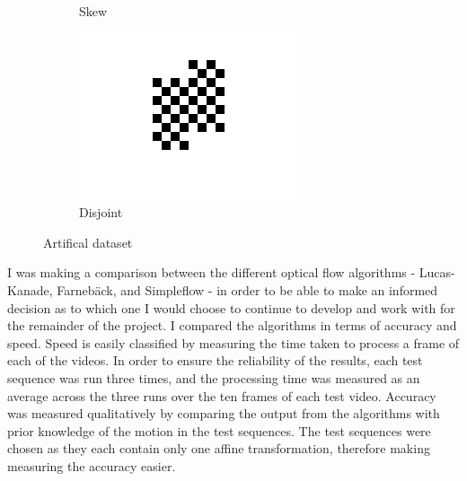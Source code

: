 \documentclass[a4paper,10pt]{article}
\begin{document}
\begin{figure}[h]
\begin{subfigure}[b]{.16\textwidth}
            \caption{Skew}
            \label{fig:skew}
          \end{subfigure}
          \begin{subfigure}[b]{.16\textwidth}
            \includegraphics[width=\textwidth]{disjoint}
            \caption{Disjoint}
            \label{fig:disj}
          \end{subfigure}
          \caption{Artifical dataset}
          \label{fig:artificial}
       \end{figure}
       
       I was making a comparison between the different optical flow algorithms - Lucas-Kanade, Farnebäck, and Simpleflow - in order to be able to make an informed decision as to which one I would choose to continue to develop and work with for the remainder of the project. I compared the algorithms in terms of accuracy and speed. Speed is easily classified by measuring the time taken to process a frame of each of the videos. In order to ensure the reliability of the results, each test sequence was run three times, and the processing time was measured as an average across the three runs over the ten frames of each test video. Accuracy was measured qualitatively by comparing the output from the algorithms with prior knowledge of the motion in the test sequences. The test sequences were chosen as they each contain only one affine transformation, therefore making measuring the accuracy easier.
       
\end{document}
